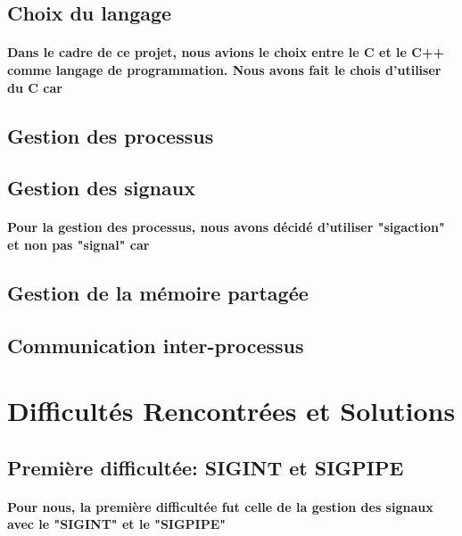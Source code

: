 \documentclass[utf8]{article}
\begin{document}
\subsection{Choix du langage}
\paragraph{Dans le cadre de ce projet, nous avions le choix entre le C et le C++ comme langage de programmation.
Nous avons fait le chois d'utiliser du C car}
\subsection{Gestion des processus}
\paragraph{}
\subsection{Gestion des signaux}
\paragraph{Pour la gestion des processus, nous avons décidé d'utiliser "sigaction" et non pas "signal" car}
\subsection{Gestion de la mémoire partagée}
\paragraph{}
\subsection{Communication inter-processus}
\paragraph{}

\section{Difficultés Rencontrées et Solutions}
\subsection{Première difficultée: SIGINT et SIGPIPE}
\paragraph{Pour nous, la première difficultée fut celle de la gestion des signaux avec le "SIGINT" et le "SIGPIPE"}
\end{document}
